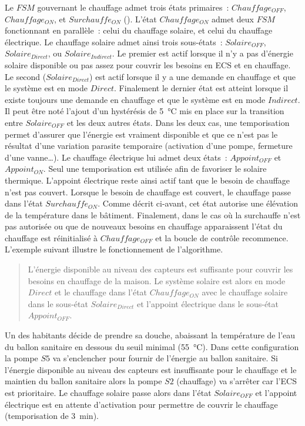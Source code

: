 Le $FSM$ gouvernant le chauffage admet trois états primaires~: $Chauffage_{OFF}$,
$Chauffage_{ON}$, et $Surchauffe_{ON}$ (). L’état
$Chauffage_{ON}$ admet deux $FSM$ fonctionnant en parallèle~: celui du chauffage
solaire, et celui du chauffage électrique. Le chauffage solaire admet ainsi trois sous-états~:
$Solaire_{OFF}$, $Solaire_{Direct}$, ou $Solaire_{Indirect}$. Le premier est actif lorsque
il n’y a pas d’énergie solaire disponible ou pas assez pour couvrir les besoins en ECS et
en chauffage. Le second ($Solaire_{Direct}$) est actif lorsque il y a une demande en
chauffage et que le système est en mode $Direct$. Finalement le dernier état est atteint
lorsque il existe toujours une demande en chauffage et que le système est en mode
$Indirect$.
Il peut être noté l’ajout d’un hystérésis de \SI{5}{\celsius} mis en place sur la
transition entre $Solaire_{OFF}$ et les deux autres états. Dans les deux cas, une
temporisation permet d’assurer que l’énergie est vraiment disponible et que ce n’est pas
le résultat d’une variation parasite temporaire (activation d’une pompe, fermeture d’une
vanne\dots). Le chauffage électrique lui admet deux états~: $Appoint_{OFF}$ et
$Appoint_{ON}$. Seul une temporisation est utilisée afin de favoriser le solaire thermique.
L’appoint électrique reste ainsi actif tant que le besoin de chauffage n’est pas couvert.
Lorsque le besoin de chauffage est couvert, le chauffage passe dans l’état
$Surchauffe_{ON}$. Comme décrit ci-avant, cet état autorise une élévation de la température
dans le bâtiment. Finalement, dans le cas où la surchauffe n’est pas autorisée ou que de nouveaux
besoins en chauffage apparaissent l’état du chauffage est réinitialisé à $Chauffage_{OFF}$
et la boucle de contrôle recommence.
L’exemple suivant illustre le fonctionnement de l’algorithme.
\blockquote{L’énergie disponible au niveau des capteurs est suffisante pour couvrir les besoins en chauffage de
la maison. Le système solaire est alors en mode $Direct$ et le chauffage dans l’état
$Chauffage_{ON}$ avec le chauffage solaire dans le sous-état $Solaire_{Direct}$ et
l’appoint électrique dans le sous-état $Appoint_{OFF}$.}
Un des habitants décide de prendre sa douche, abaissant la température de l’eau du ballon
sanitaire en dessous du seuil minimal (\SI{55}{\celsius}). Dans cette configuration la
pompe $S5$ va s’enclencher pour fournir de l’énergie au ballon sanitaire. Si l’énergie
disponible au niveau des capteurs est insuffisante pour le chauffage et le maintien du
ballon sanitaire alors la pompe $S2$ (chauffage) va s’arrêter car l’ECS est prioritaire.
Le chauffage solaire passe alors dans l’état $Solaire_{OFF}$ et l’appoint électrique est
en attente d’activation pour permettre de couvrir le chauffage (temporisation de
\SI{3}{\minute}).

